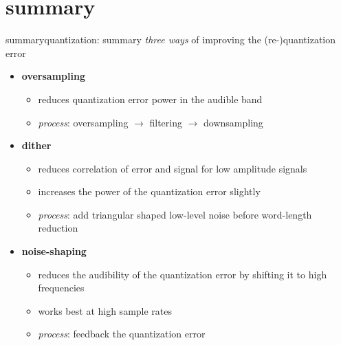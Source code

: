 	\section{summary}	
		\begin{frame}{summary}{quantization: summary}
            \textit{three ways} of improving the (re-)quantization error
            \begin{itemize}
                \item   \textbf{oversampling}
                    \begin{itemize}
                        \item   reduces quantization error power in the audible band 
                        \item   \textit{process}: oversampling $\rightarrow$ filtering $\rightarrow$ downsampling
                    \end{itemize}
                \bigskip
                \item<2->   \textbf{dither}
                    \begin{itemize}
                        \item   reduces correlation of error and signal for low amplitude signals
                        \item   increases the power of the quantization error slightly
                        \item   \textit{process}: add triangular shaped low-level noise before word-length reduction
                    \end{itemize}
                \bigskip
                \item<3->   \textbf{noise-shaping}
                    \begin{itemize}
                        \item   reduces the audibility of the quantization error by shifting it to high frequencies 
                        \item   works best at high sample rates
                        \item   \textit{process}: feedback the quantization error
                    \end{itemize}
            \end{itemize}
		\end{frame}
 




